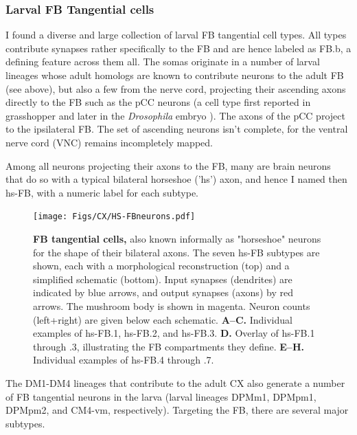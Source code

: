         \subsubsection{Larval FB Tangential cells}
        I found a diverse and large collection of larval FB tangential cell types.
        All types contribute synapses rather specifically to the FB and are hence labeled as FB.b, a defining feature across them all.
        The somas originate in a number of larval lineages whose adult homologs  are known to contribute neurons to the adult FB (see above), but also a few from the nerve cord, projecting their ascending axons directly to the FB such as the pCC neurons (a cell type first reported in grasshopper \citep{goodman1984pCC} and later in the \textit{Drosophila} embryo \citep{jacobs1989pCC}). The axons of the pCC project to the ipsilateral FB. The set of ascending neurons isn't complete, for the ventral nerve cord (VNC) remains incompletely mapped.

        Among all neurons projecting their axons to the FB, many are brain neurons that do so with a typical bilateral horseshoe ('hs') axon, and hence I named then hs-FB, with a numeric label for each subtype.

            \begin{figure}[H]
                \centering
                \texttt{[image: Figs/CX/HS-FBneurons.pdf]}
                \caption{\textbf{FB tangential cells,} also known informally as "horseshoe" neurons for the shape of their bilateral axons. The seven hs-FB subtypes are shown, each with a morphological reconstruction (top) and a simplified schematic (bottom). Input synapses (dendrites) are indicated by blue arrows, and output synapses (axons) by red arrows. The mushroom body is shown in magenta. Neuron counts (left+right) are given below each schematic. \textbf{A–C.} Individual examples of hs-FB.1, hs-FB.2, and hs-FB.3. \textbf{D.} Overlay of hs-FB.1 through .3, illustrating the FB compartments they define. \textbf{E–H.} Individual examples of hs-FB.4 through .7.}
            \label{fig:HSFBneurons}
            \end{figure}

        The DM1-DM4 lineages that contribute to the adult CX also generate a number of FB tangential neurons in the larva (larval lineages DPMm1, DPMpm1, DPMpm2, and CM4-vm, respectively). Targeting the FB, there are several major subtypes. 
        
